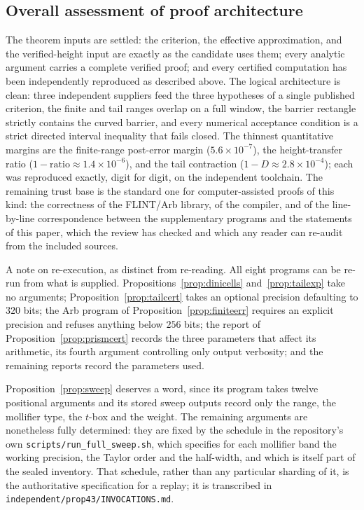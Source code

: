 \documentclass[11pt]{article}
\theoremstyle{definition}
\begin{document}
\subsection*{Overall assessment of proof architecture}
The theorem inputs are settled: the criterion, the effective
approximation, and the verified-height input are exactly as the
candidate uses them; every analytic argument carries a complete
verified proof; and every certified computation has been
independently reproduced as described above. The logical
architecture is clean: three independent suppliers feed the three
hypotheses of a single published criterion, the finite and tail
ranges overlap on a full window, the barrier rectangle strictly
contains the curved barrier, and every numerical acceptance
condition is a strict directed interval inequality that fails
closed. The thinnest quantitative margins are the finite-range
post-error margin ($5.6\times10^{-7}$), the height-transfer ratio
($1-\text{ratio}\approx1.4\times10^{-6}$), and the tail contraction
($1-D\approx2.8\times10^{-4}$); each was reproduced exactly, digit
for digit, on the independent toolchain. The remaining trust base
is the standard one for computer-assisted proofs of this kind: the
correctness of the FLINT/Arb library, of the compiler, and of the
line-by-line correspondence between the supplementary programs and
the statements of this paper, which the review has checked and
which any reader can re-audit from the included sources.

A note on re-execution, as distinct from re-reading. All eight
programs can be re-run from what is supplied.
Propositions~\ref{prop:dinicells} and~\ref{prop:tailexp} take no
arguments; Proposition~\ref{prop:tailcert} takes an optional
precision defaulting to $320$ bits; the Arb program of
Proposition~\ref{prop:finiteerr} requires an explicit precision
and refuses anything below $256$ bits; the report of
Proposition~\ref{prop:prismcert} records the three parameters that
affect its arithmetic, its fourth argument controlling only output
verbosity; and the remaining reports record the parameters used.

Proposition~\ref{prop:sweep} deserves a word, since its program
takes twelve positional arguments and its stored sweep outputs
record only the range, the mollifier type, the $t$-box and the
weight. The remaining arguments are nonetheless fully determined:
they are fixed by the schedule in the repository's own
\texttt{scripts/run\_full\_sweep.sh}, which specifies for each
mollifier band the working precision, the Taylor order and the
half-width, and which is itself part of the sealed inventory. That
schedule, rather than any particular sharding of it, is the
authoritative specification for a replay; it is transcribed in
\texttt{independent/prop43/INVOCATIONS.md}.
\end{document}
